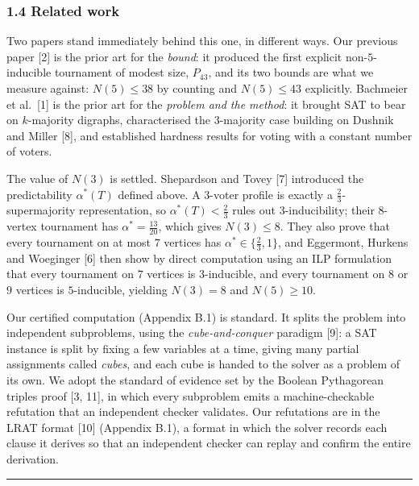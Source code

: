 \documentclass[
]{article}
\begin{document}
\subsubsection{1.4 Related work}\label{related-work}

Two papers stand immediately behind this one, in different ways. Our
previous paper {[}2{]} is the prior art for the \emph{bound}: it
produced the first explicit non-\(5\)-inducible tournament of modest
size, \(P_{43}\), and its two bounds are what we measure against:
\(N(5) \le 38\) by counting and \(N(5) \le 43\) explicitly. Bachmeier et
al.~{[}1{]} is the prior art for the \emph{problem and the method}: it
brought SAT to bear on \(k\)-majority digraphs, characterised the
\(3\)-majority case building on Dushnik and Miller {[}8{]}, and
established hardness results for voting with a constant number of
voters.

The value of \(N(3)\) is settled. Shepardson and Tovey {[}7{]}
introduced the predictability \(\alpha^{*}(T)\) defined above. A
\(3\)-voter profile is exactly a \(\tfrac{2}{3}\)-supermajority
representation, so \(\alpha^{*}(T) < \tfrac{2}{3}\) rules out
\(3\)-inducibility; their \(8\)-vertex tournament has
\(\alpha^{*} = \tfrac{13}{20}\), which gives \(N(3) \le 8\). They also
prove that every tournament on at most \(7\) vertices has
\(\alpha^{*} \in \{\tfrac{2}{3}, 1\}\), and Eggermont, Hurkens and
Woeginger {[}6{]} then show by direct computation using an ILP
formulation that every tournament on \(7\) vertices is \(3\)-inducible,
and every tournament on \(8\) or \(9\) vertices is \(5\)-inducible,
yielding \(N(3) = 8\) and \(N(5) \ge 10\).

Our certified computation (Appendix B.1) is standard. It splits the
problem into independent subproblems, using the \emph{cube-and-conquer}
paradigm {[}9{]}: a SAT instance is split by fixing a few variables at a
time, giving many partial assignments called \emph{cubes}, and each cube
is handed to the solver as a problem of its own. We adopt the standard
of evidence set by the Boolean Pythagorean triples proof {[}3, 11{]}, in
which every subproblem emits a machine-checkable refutation that an
independent checker validates. Our refutations are in the LRAT format
{[}10{]} (Appendix B.1), a format in which the solver records each
clause it derives so that an independent checker can replay and confirm
the entire derivation.

\begin{center}\rule{0.5\linewidth}{0.5pt}\end{center}
\end{document}
